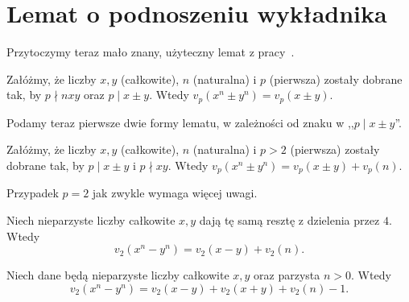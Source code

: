 \section{Lemat o podnoszeniu wykładnika}
Przytoczymy teraz mało znany, użyteczny lemat z pracy~\cite{parvardi11}.
\begin{lemat}
	Załóżmy, że liczby $x,y$ (całkowite), $n$ (naturalna) i $p$ (pierwsza) zostały dobrane tak, by $p \nmid nxy$ oraz $p \mid x \pm y$.
	Wtedy $v_p(x^n\pm y^n) = v_p(x \pm y)$.
\end{lemat}

Podamy teraz pierwsze dwie formy lematu, w zależności od znaku w ,,$p \mid x \pm y$''.

\begin{fakt}
	Załóżmy, że liczby $x,y$ (całkowite), $n$ (naturalna) i $p > 2$ (pierwsza) zostały dobrane tak, by $p \mid x \pm y$ i $p \nmid xy$.
	Wtedy $v_p(x^n \pm y^n) = v_p(x \pm y) + v_p(n)$.
\end{fakt}

Przypadek $p=2$ jak zwykle wymaga więcej uwagi.

\begin{fakt}
	Niech nieparzyste liczby całkowite $x,y$ dają tę samą resztę z dzielenia przez $4$.
	Wtedy \[v_2(x^n-y^n) = v_2(x-y) + v_2(n).\]
\end{fakt}

\begin{fakt}
	Niech dane będą nieparzyste liczby całkowite $x,y$ oraz parzysta $n > 0$.
	Wtedy 
	\[
		v_2(x^n-y^n) = v_2(x-y) + v_2(x+y) + v_2(n) - 1.
	\]
\end{fakt}
